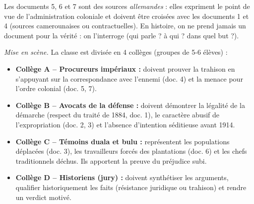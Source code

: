 \documentclass[11pt]{article}
\begin{document}
\begin{attention}
Les documents 5, 6 et 7 sont des sources \emph{allemandes} : elles expriment le point de vue de l'administration coloniale et doivent être croisées avec les documents 1 et 4 (sources camerounaises ou contractuelles). En histoire, on ne prend jamais un document pour la vérité : on l'interroge (qui parle ? à qui ? dans quel but ?).
\end{attention}

\emph{Mise en scène.} La classe est divisée en 4 collèges (groupes de 5-6 élèves) :
\begin{itemize}
    \item \textbf{Collège A -- Procureurs impériaux :} doivent prouver la trahison en s'appuyant sur la correspondance avec l'ennemi (doc. 4) et la menace pour l'ordre colonial (doc. 5, 7).
    \item \textbf{Collège B -- Avocats de la défense :} doivent démontrer la légalité de la démarche (respect du traité de 1884, doc. 1), le caractère abusif de l'expropriation (doc. 2, 3) et l'absence d'intention séditieuse avant 1914.
    \item \textbf{Collège C -- Témoins duala et bulu :} représentent les populations déplacées (doc. 3), les travailleurs forcés des plantations (doc. 6) et les chefs traditionnels déchus. Ils apportent la preuve du préjudice subi.
    \item \textbf{Collège D -- Historiens (jury) :} doivent synthétiser les arguments, qualifier historiquement les faits (résistance juridique ou trahison) et rendre un verdict motivé.
\end{itemize}
\end{document}
